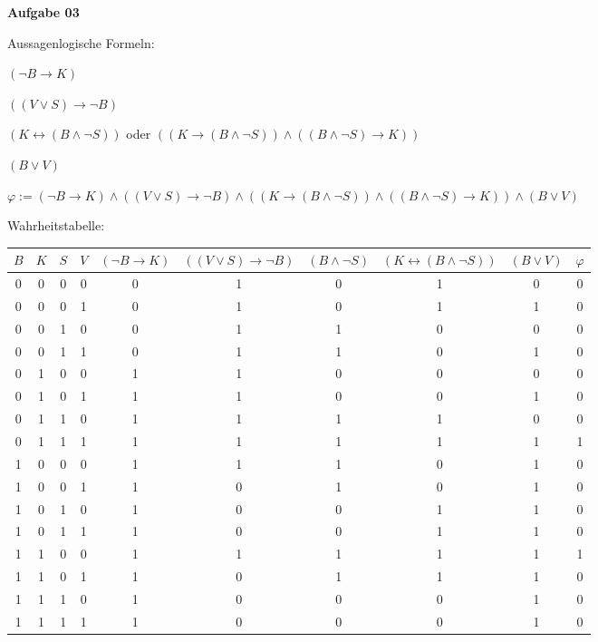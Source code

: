 \documentclass[a4paper,10pt]{article}
\begin{document}
	\textbf{Aufgabe 03}
	\begin{compactenum}[(a)]
		\item Aussagenlogische Formeln:
		\begin{compactenum}[I:]
			\item $(\lnot B \rightarrow K)$
			\item $((V \vee S) \rightarrow \lnot B)$
			\item $(K \leftrightarrow (B \wedge \lnot S))$ oder $((K \rightarrow (B \wedge \lnot S)) \wedge ((B \wedge \lnot S) \rightarrow K))$
			\item $(B \vee V)$
		\end{compactenum}
		\item $\varphi:= (\lnot B \rightarrow K) \wedge ((V \vee S) \rightarrow \lnot B) \wedge ((K \rightarrow (B \wedge \lnot S)) \wedge ((B \wedge \lnot S) \rightarrow K)) \wedge (B \vee V)$

		\item Wahrheitstabelle: \\
		\begin{tabular}{c|c|c|c|c|c|c|c|c|c}
			$B$ & $K$ & $S$ & $V$ & $(\lnot B \rightarrow K)$ & $((V \vee S) \rightarrow \lnot B)$ & $(B \wedge \lnot S)$ & $(K \leftrightarrow (B \wedge \lnot S))$ & $(B \vee V)$ & $\varphi$ \\ \hline
			0 & 0 & 0 & 0 & 0 & 1 & 0 & 1 & 0 & 0\\
			0 & 0 & 0 & 1 & 0 & 1 & 0 & 1 & 1 & 0\\
			0 & 0 & 1 & 0 & 0 & 1 & 1 & 0 & 0 & 0\\
			0 & 0 & 1 & 1 & 0 & 1 & 1 & 0 & 1 & 0\\
			0 & 1 & 0 & 0 & 1 & 1 & 0 & 0 & 0 & 0\\
			0 & 1 & 0 & 1 & 1 & 1 & 0 & 0 & 1 & 0\\
			0 & 1 & 1 & 0 & 1 & 1 & 1 & 1 & 0 & 0\\
			\rowcolor{lightgray}0 & 1 & 1 & 1 & 1 & 1 & 1 & 1 & 1 & 1\\
			1 & 0 & 0 & 0 & 1 & 1 & 1 & 0 & 1 & 0\\
			1 & 0 & 0 & 1 & 1 & 0 & 1 & 0 & 1 & 0\\
			1 & 0 & 1 & 0 & 1 & 0 & 0 & 1 & 1 & 0\\
			1 & 0 & 1 & 1 & 1 & 0 & 0 & 1 & 1 & 0\\
			\rowcolor{lightgray}1 & 1 & 0 & 0 & 1 & 1 & 1 & 1 & 1 & 1\\
			1 & 1 & 0 & 1 & 1 & 0 & 1 & 1 & 1 & 0\\
			1 & 1 & 1 & 0 & 1 & 0 & 0 & 0 & 1 & 0\\
			1 & 1 & 1 & 1 & 1 & 0 & 0 & 0 & 1 & 0\\
		\end{tabular}
		\newpage


\end{compactenum}
\end{document}
